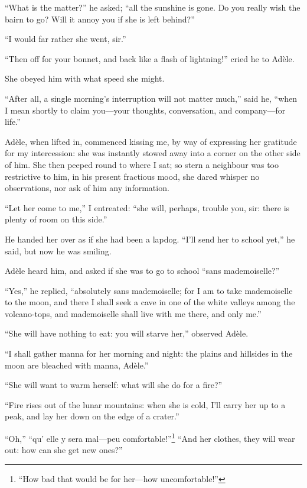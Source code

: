\enquote{What is the matter?} he asked; \enquote{all the sunshine is
gone.  Do you really wish the bairn to go?  Will it annoy you if she is
left behind?}

\enquote{I would far rather she went, sir.}

\enquote{Then off for your bonnet, and back like a flash of lightning!}
cried he to Adèle.

She obeyed him with what speed she might.

\enquote{After all, a single morning's interruption will not matter
much,} said he, \enquote{when I mean shortly to claim you---your
thoughts, conversation, and company---for life.}

Adèle, when lifted in, commenced kissing me, by way of expressing her
gratitude for my intercession: she was instantly stowed away into a
corner on the other side of him.  She then peeped round to where I sat;
so stern a neighbour was too restrictive to him, in his present
fractious mood, she dared whisper no observations, nor ask of him any
information.

\enquote{Let her come to me,} I entreated: \enquote{she will, perhaps,
trouble you, sir: there is plenty of room on this side.}

He handed her over as if she had been a lapdog.  \enquote{I'll send her
to school yet,} he said, but now he was smiling.

Adèle heard him, and asked if she was to go to school \enquote{sans
mademoiselle?}

\enquote{Yes,} he replied, \enquote{absolutely sans mademoiselle; for I
am to take mademoiselle to the moon, and there I shall seek a cave in
one of the white valleys among the volcano-tops, and mademoiselle shall
live with me there, and only me.}

\enquote{She will have nothing to eat: you will starve her,} observed
Adèle.

\enquote{I shall gather manna for her morning and night: the plains and
hillsides in the moon are bleached with manna, Adèle.}

\enquote{She will want to warm herself: what will she do for a fire?}

\enquote{Fire rises out of the lunar mountains: when she is cold, I'll
carry her up to a peak, and lay her down on the edge of a crater.}

\enquote{Oh,} \foreignquote{french}{qu' elle y sera mal---peu comfortable!}\footnote{
\enquote{How bad that would be for her---how uncomfortable!}}
\enquote{And her clothes, they will wear out: how can she get new ones?}

